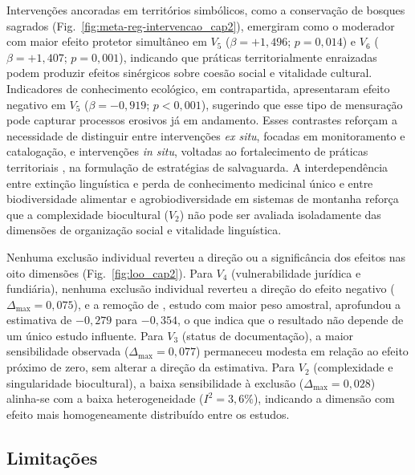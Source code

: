 Intervenções ancoradas em territórios simbólicos, como a conservação de bosques sagrados (Fig.~\ref{fig:meta-reg-intervencao_cap2}), emergiram como o moderador com maior efeito protetor simultâneo em $V_5$ ($\beta = +1{,}496$; $p = 0{,}014$) e $V_6$ ($\beta = +1{,}407$; $p = 0{,}001$), indicando que práticas territorialmente enraizadas podem produzir efeitos sinérgicos sobre coesão social e vitalidade cultural. Indicadores de conhecimento ecológico, em contrapartida, apresentaram efeito negativo em $V_5$ ($\beta = -0{,}919$; $p < 0{,}001$), sugerindo que esse tipo de mensuração pode capturar processos erosivos já em andamento. Esses contrastes reforçam a necessidade de distinguir entre intervenções \textit{ex situ}, focadas em monitoramento e catalogação, e intervenções \textit{in situ}, voltadas ao fortalecimento de práticas territoriais \cite{Zimmerer2018}, na formulação de estratégias de salvaguarda. A interdependência entre extinção linguística e perda de conhecimento medicinal único \cite{CamaraLeret2021} e entre biodiversidade alimentar e agrobiodiversidade em sistemas de montanha \cite{Zimmerer2018} reforça que a complexidade biocultural ($V_2$) não pode ser avaliada isoladamente das dimensões de organização social e vitalidade linguística.

Nenhuma exclusão individual reverteu a direção ou a significância dos efeitos nas oito dimensões (Fig.~\ref{fig:loo_cap2}). Para $V_4$ (vulnerabilidade jurídica e fundiária), nenhuma exclusão individual reverteu a direção do efeito negativo ($\Delta_{\max} = 0{,}075$), e a remoção de , estudo com maior peso amostral, aprofundou a estimativa de $-0{,}279$ para $-0{,}354$, o que indica que o resultado não depende de um único estudo influente. Para $V_3$ (status de documentação), a maior sensibilidade observada ($\Delta_{\max} = 0{,}077$) permaneceu modesta em relação ao efeito próximo de zero, sem alterar a direção da estimativa. Para $V_2$ (complexidade e singularidade biocultural), a baixa sensibilidade à exclusão ($\Delta_{\max} = 0{,}028$) alinha-se com a baixa heterogeneidade ($I^2 = 3{,}6\%$), indicando a dimensão com efeito mais homogeneamente distribuído entre os estudos.

\subsection{Limitações}
\label{sec:limitations_cap2}

